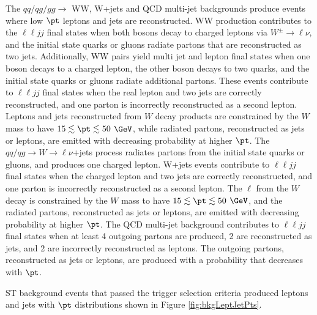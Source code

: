 The $qq/qg/gg \rightarrow$ WW, W+jets and QCD multi-jet backgrounds produce events where low $\pt$ leptons and jets are reconstructed.  
WW production contributes to the $\ell\ell jj$ final states when both bosons decay to charged leptons via $W^{\pm} \rightarrow \ell\nu$, 
and the initial state quarks or gluons radiate partons that are reconstructed as two jets.  Additionally, WW pairs yield multi jet and 
lepton final states when one boson decays to a charged lepton, the other boson decays to two quarks, and the initial state quarks or gluons 
radiate additional partons.  These events contribute to $\ell\ell jj$ final states when the real lepton and two jets are correctly 
reconstructed, and one parton is incorrectly reconstructed as a second lepton.  Leptons and jets reconstructed from $W$ decay 
products are constrained by the $W$ mass to have $15 \lesssim \pt \lesssim 50$ $\GeV$, while radiated partons, reconstructed as jets or 
leptons, are emitted with decreasing probability at higher $\pt$.  The $qq/qg \rightarrow W \rightarrow \ell\nu$+jets process radiates 
partons from the initial state quarks or gluons, and produces one charged lepton.  W+jets events contribute to $\ell\ell jj$ final states 
when the charged lepton and two jets are correctly reconstructed, and one parton is incorrectly reconstructed as a second lepton.  The 
$\ell$ from the $W$ decay is constrained by the $W$ mass to have $15 \lesssim \pt \lesssim 50$ $\GeV$, and the radiated partons, 
reconstructed as jets or leptons, are emitted with decreasing probability at higher $\pt$.  The QCD multi-jet background contributes to 
$\ell\ell jj$ final states when at least 4 outgoing partons are produced, 2 are reconstructed as jets, and 2 are incorrectly reconstructed 
as leptons.  The outgoing partons, reconstructed as jets or leptons, are produced with a probability that decreases with $\pt$.

ST background events that passed the trigger selection criteria produced leptons and jets with $\pt$ distributions shown in Figure 
\ref{fig:bkgLeptJetPts}.

